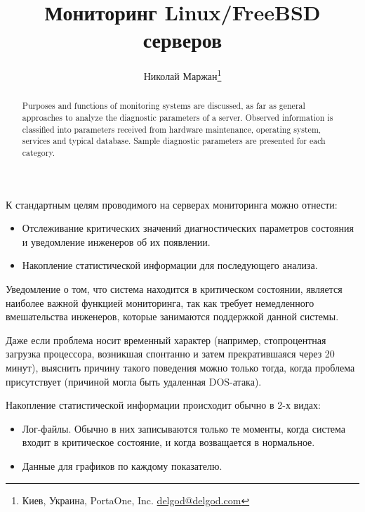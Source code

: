 \documentclass[10pt, a5paper]{article}
\begin{document}
\title{Мониторинг Linux/FreeBSD серверов}
\author{Николай Маржан\footnote{Киев, Украина, PortaOne, Inc. \url{delgod@delgod.com}}}

\maketitle



\begin{abstract}Purposes and functions of monitoring systems are discussed, as far as general approaches to analyze the diagnostic parameters of a server. Observed information is classified into parameters received from hardware maintenance, operating system, services and typical database. Sample diagnostic parameters are presented for each category.
\end{abstract}

К стандартным целям проводимого на серверах мониторинга можно отнести:
\begin{itemize}
	\item Отслеживание критических значений диагностических параметров состояния и уведомление инженеров об их появлении.
	\item Накопление статистической информации для последующего анализа.
\end{itemize}

Уведомление о том, что система находится в критическом состоянии, является наиболее важной функцией мониторинга, так как требует немедленного вмешательства инженеров, которые занимаются поддержкой данной системы.

Даже если проблема носит временный характер (например, стопроцентная загрузка процессора, возникшая спонтанно и затем прекратившаяся через 20 минут), выяснить причину такого поведения можно только тогда, когда проблема присутствует (причиной могла быть удаленная DOS-атака).

Накопление статистической информации происходит обычно в 2-х видах:
\begin{itemize}
	\item Лог-файлы. Обычно в них записываются только те моменты, когда система входит в критическое состояние, и когда возващается в нормальное.
	\item Данные для графиков по каждому показателю.
\end{itemize}
\end{document}
